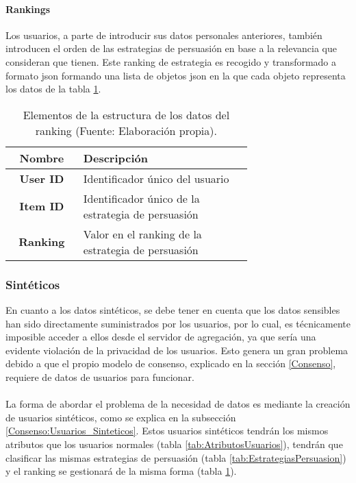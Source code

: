 \paragraph{Rankings\\}
Los usuarios, a parte de introducir sus datos personales anteriores, también introducen el orden de las estrategias de persuasión en base a la relevancia que consideran que tienen. Este ranking de estrategia es recogido y transformado a formato json formando una lista de objetos json en la que cada objeto representa los datos de la tabla \ref{tab:RankingUsuario}.
\begin{table}[H]
    \begin{center}
        \begin{tabular}{|c|p{0.7\linewidth}|}
            \hline
            \rowcolor{Cyan} 
            \textbf{Nombre} & \textbf{Descripción}\\ 
            \hline
            \textbf{User ID}  & Identificador único del usuario\\
            \hline
            \rowcolor{GrisTabla}
            \textbf{Item ID}  & Identificador único de la estrategia de persuasión\\
            \hline
            \textbf{Ranking} & Valor en el ranking de la estrategia de persuasión\\
            \hline
        \end{tabular}
        \caption{\centering Elementos de la estructura de los datos del ranking  (Fuente: Elaboración propia).}
        \label{tab:RankingUsuario}
    \end{center}    
\end{table}


\subsubsection{Sintéticos}
En cuanto a los datos sintéticos, se debe tener en cuenta que los datos sensibles han sido directamente suministrados por los usuarios, por lo cual, es técnicamente imposible acceder a ellos desde el servidor de agregación, ya que sería una evidente violación de la privacidad de los usuarios. Esto genera un gran problema debido a que el propio modelo de consenso, explicado en la sección \ref{Consenso}, requiere de datos de usuarios para funcionar.
\\ \\
La forma de abordar el problema de la necesidad de datos es mediante la creación de usuarios sintéticos, como se explica en la subsección \ref{Consenso:Usuarios_Sinteticos}. Estos usuarios sintéticos tendrán los mismos atributos que los usuarios normales (tabla \ref{tab:AtributosUsuarios}), tendrán que clasificar las mismas estrategias de persuasión (tabla \ref{tab:EstrategiasPersuasion}) y el ranking se gestionará de la misma forma (tabla \ref{tab:RankingUsuario}).
